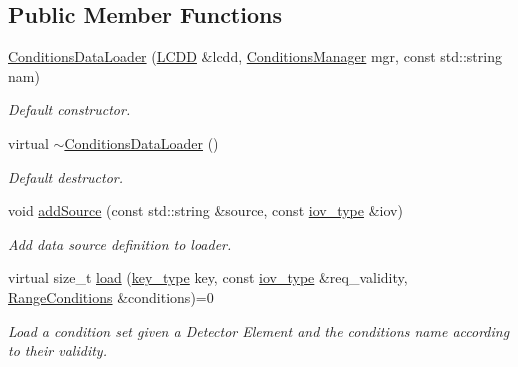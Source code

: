 \subsection*{Public Member Functions}
\begin{DoxyCompactItemize}
\item 
\hyperlink{class_d_d4hep_1_1_conditions_1_1_conditions_data_loader_a893800746f5a864696c4486469057567}{Conditions\+Data\+Loader} (\hyperlink{class_d_d4hep_1_1_geometry_1_1_l_c_d_d}{L\+C\+DD} \&lcdd, \hyperlink{class_d_d4hep_1_1_conditions_1_1_conditions_manager}{Conditions\+Manager} mgr, const std\+::string nam)
\begin{DoxyCompactList}\small\item\em Default constructor. \end{DoxyCompactList}\item 
virtual \hyperlink{class_d_d4hep_1_1_conditions_1_1_conditions_data_loader_a5918a0778c3e0f0f80a441a5f3b88770}{$\sim$\+Conditions\+Data\+Loader} ()
\begin{DoxyCompactList}\small\item\em Default destructor. \end{DoxyCompactList}\item 
void \hyperlink{class_d_d4hep_1_1_conditions_1_1_conditions_data_loader_a5f4cea772ab0ac281d16f2eb0a52c4c4}{add\+Source} (const std\+::string \&source, const \hyperlink{class_d_d4hep_1_1_conditions_1_1_conditions_data_loader_a510aa9a02f5e798d8d96c9e3cb5a36af}{iov\+\_\+type} \&iov)
\begin{DoxyCompactList}\small\item\em Add data source definition to loader. \end{DoxyCompactList}\item 
virtual size\+\_\+t \hyperlink{class_d_d4hep_1_1_conditions_1_1_conditions_data_loader_a5ae9c04eb1198bf3ca9bc6d54e6bfd8c}{load} (\hyperlink{class_d_d4hep_1_1_conditions_1_1_conditions_data_loader_ac17b71656c9d6b5365c62d1d606ba8cc}{key\+\_\+type} key, const \hyperlink{class_d_d4hep_1_1_conditions_1_1_conditions_data_loader_a510aa9a02f5e798d8d96c9e3cb5a36af}{iov\+\_\+type} \&req\+\_\+validity, \hyperlink{namespace_d_d4hep_1_1_conditions_ae765f0140a33973a430280f02b6062f4}{Range\+Conditions} \&conditions)=0
\begin{DoxyCompactList}\small\item\em Load a condition set given a Detector Element and the conditions name according to their validity. \end{DoxyCompactList}\item 

\end{DoxyCompactItemize}
